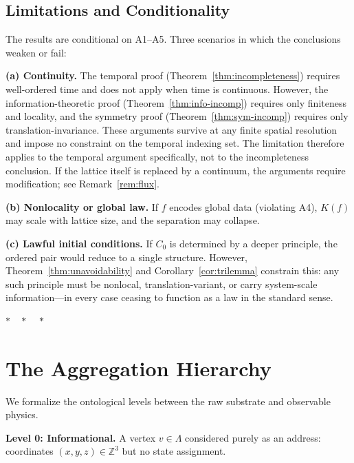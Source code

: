 \documentclass[12pt]{article}
\theoremstyle{plain}
\theoremstyle{definition}
\theoremstyle{remark}
\newcommand{\Lattice}{\Lambda}
\newcommand{\Integer}{\mathbb{Z}}
\begin{document}
\subsection{Limitations and Conditionality}

The results are conditional on A1--A5. Three scenarios in which the conclusions weaken or fail:

\medskip
\noindent\textbf{(a) Continuity.} The temporal proof (Theorem~\ref{thm:incompleteness}) requires well-ordered time and does not apply when time is continuous. However, the information-theoretic proof (Theorem~\ref{thm:info-incomp}) requires only finiteness and locality, and the symmetry proof (Theorem~\ref{thm:sym-incomp}) requires only translation-invariance. These arguments survive at any finite spatial resolution and impose no constraint on the temporal indexing set. The limitation therefore applies to the temporal argument specifically, not to the incompleteness conclusion. If the lattice itself is replaced by a continuum, the arguments require modification; see Remark~\ref{rem:flux}.

\medskip
\noindent\textbf{(b) Nonlocality or global law.} If $f$ encodes global data (violating A4), $K(f)$ may scale with lattice size, and the separation may collapse.

\medskip
\noindent\textbf{(c) Lawful initial conditions.} If $C_0$ is determined by a deeper principle, the ordered pair would reduce to a single structure. However, Theorem~\ref{thm:unavoidability} and Corollary~\ref{cor:trilemma} constrain this: any such principle must be nonlocal, translation-variant, or carry system-scale information---in every case ceasing to function as a law in the standard sense.

\begin{center}
$*\quad*\quad*$
\end{center}


\appendix
\section{The Aggregation Hierarchy}
\label{app:hierarchy}

We formalize the ontological levels between the raw substrate and observable physics.

\medskip
\noindent\textbf{Level 0: Informational.} A vertex $v \in \Lattice$ considered purely as an address: coordinates $(x,y,z) \in \Integer^3$ but no state assignment.
\end{document}
